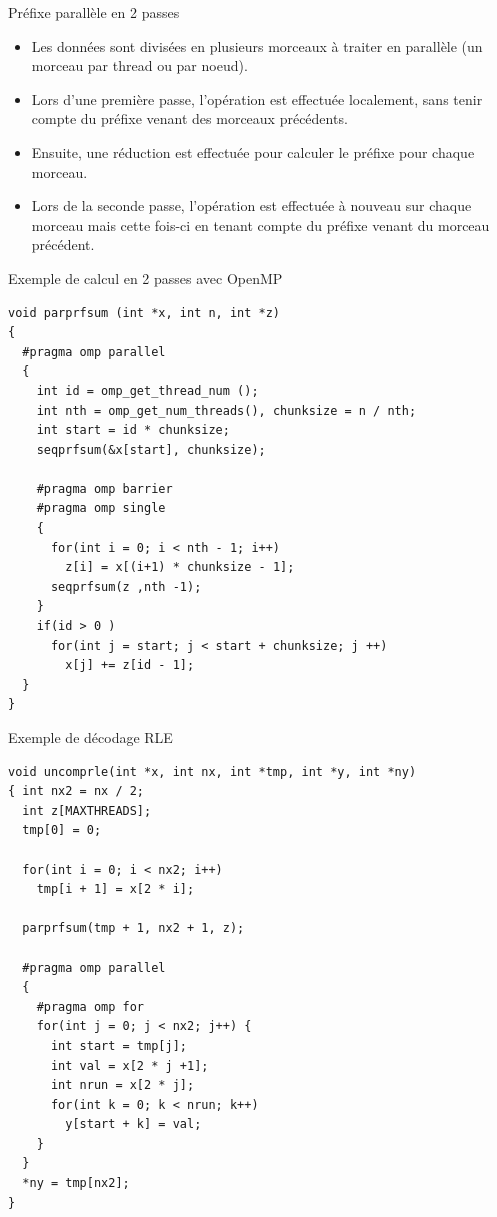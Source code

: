 \documentclass[10pt]{beamer}
\begin{document}
\begin{frame}[fragile]{Préfixe parallèle en 2 passes}

  \begin{itemize}
    \item Les données sont divisées en plusieurs morceaux à traiter en parallèle (un morceau par thread ou par noeud).

    \item Lors d'une première passe, l'opération est effectuée localement, sans tenir compte du préfixe venant des morceaux précédents.

    \item Ensuite, une réduction est effectuée pour calculer le préfixe pour chaque morceau.

    \item Lors de la seconde passe, l'opération est effectuée à nouveau sur chaque morceau mais cette fois-ci en tenant compte du préfixe venant du morceau précédent.
  \end{itemize}
\end{frame}

\begin{frame}[fragile]{Exemple de calcul en 2 passes avec OpenMP}

  \scriptsize
  \begin{verbatim}
void parprfsum (int *x, int n, int *z)
{ 
  #pragma omp parallel
  { 
    int id = omp_get_thread_num ();
    int nth = omp_get_num_threads(), chunksize = n / nth;
    int start = id * chunksize;
    seqprfsum(&x[start], chunksize);

    #pragma omp barrier
    #pragma omp single
    { 
      for(int i = 0; i < nth - 1; i++) 
        z[i] = x[(i+1) * chunksize - 1];
      seqprfsum(z ,nth -1);
    }
    if(id > 0 ) 
      for(int j = start; j < start + chunksize; j ++)
        x[j] += z[id - 1];
  }
}
  \end{verbatim}
\end{frame}

\begin{frame}[fragile]{Exemple de décodage RLE}

  \scriptsize
  \begin{verbatim}
void uncomprle(int *x, int nx, int *tmp, int *y, int *ny)
{ int nx2 = nx / 2;
  int z[MAXTHREADS];
  tmp[0] = 0;

  for(int i = 0; i < nx2; i++) 
    tmp[i + 1] = x[2 * i];
  
  parprfsum(tmp + 1, nx2 + 1, z);

  #pragma omp parallel
  {
    #pragma omp for
    for(int j = 0; j < nx2; j++) {
      int start = tmp[j];
      int val = x[2 * j +1];
      int nrun = x[2 * j];
      for(int k = 0; k < nrun; k++) 
        y[start + k] = val;
    }
  }
  *ny = tmp[nx2];
}
  \end{verbatim}
\end{frame}
\end{document}

